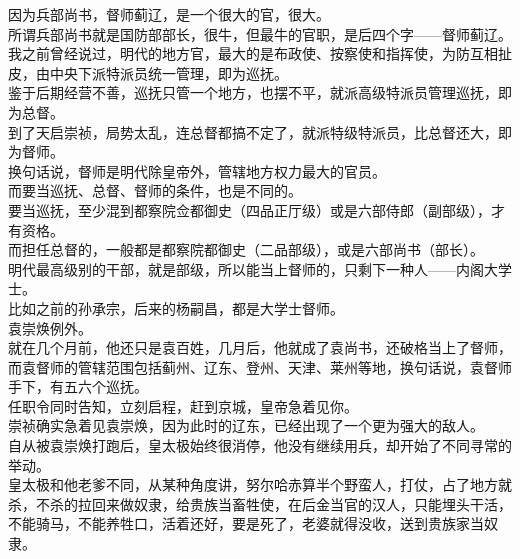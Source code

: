 \begin{multicols}{\theparacolNo}
因为兵部尚书，督师蓟辽，是一个很大的官，很大。\\

所谓兵部尚书就是国防部部长，很牛，但最牛的官职，是后四个字——督师蓟辽。\\

我之前曾经说过，明代的地方官，最大的是布政使、按察使和指挥使，为防互相扯皮，由中央下派特派员统一管理，即为巡抚。\\

鉴于后期经营不善，巡抚只管一个地方，也摆不平，就派高级特派员管理巡抚，即为总督。\\

到了天启崇祯，局势太乱，连总督都搞不定了，就派特级特派员，比总督还大，即为督师。\\

换句话说，督师是明代除皇帝外，管辖地方权力最大的官员。\\

而要当巡抚、总督、督师的条件，也是不同的。\\

要当巡抚，至少混到都察院佥都御史（四品正厅级）或是六部侍郎（副部级），才有资格。\\

而担任总督的，一般都是都察院都御史（二品部级），或是六部尚书（部长）。\\

明代最高级别的干部，就是部级，所以能当上督师的，只剩下一种人——内阁大学士。\\

比如之前的孙承宗，后来的杨嗣昌，都是大学士督师。\\

袁崇焕例外。\\

就在几个月前，他还只是袁百姓，几月后，他就成了袁尚书，还破格当上了督师，而袁督师的管辖范围包括蓟州、辽东、登州、天津、莱州等地，换句话说，袁督师手下，有五六个巡抚。\\

任职令同时告知，立刻启程，赶到京城，皇帝急着见你。\\

崇祯确实急着见袁崇焕，因为此时的辽东，已经出现了一个更为强大的敌人。\\

自从被袁崇焕打跑后，皇太极始终很消停，他没有继续用兵，却开始了不同寻常的举动。\\

皇太极和他老爹不同，从某种角度讲，努尔哈赤算半个野蛮人，打仗，占了地方就杀，不杀的拉回来做奴隶，给贵族当畜牲使，在后金当官的汉人，只能埋头干活，不能骑马，不能养牲口，活着还好，要是死了，老婆就得没收，送到贵族家当奴隶。\\


\end{multicols}
